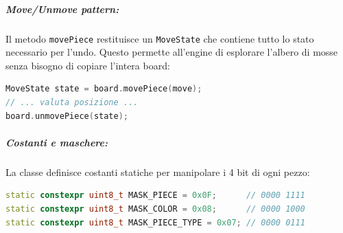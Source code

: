 \subparagraph{Move/Unmove pattern:}
Il metodo \texttt{movePiece} restituisce un \texttt{MoveState} che contiene tutto lo stato necessario
per l'undo. Questo permette all'engine di esplorare l'albero di mosse senza bisogno di copiare
l'intera board:
\begin{lstlisting}[language=C++]
MoveState state = board.movePiece(move);
// ... valuta posizione ...
board.unmovePiece(state);
\end{lstlisting}

\subparagraph{Costanti e maschere:}
La classe definisce costanti statiche per manipolare i 4 bit di ogni pezzo:
\begin{lstlisting}[language=C++]
static constexpr uint8_t MASK_PIECE = 0x0F;      // 0000 1111
static constexpr uint8_t MASK_COLOR = 0x08;      // 0000 1000
static constexpr uint8_t MASK_PIECE_TYPE = 0x07; // 0000 0111
\end{lstlisting}

